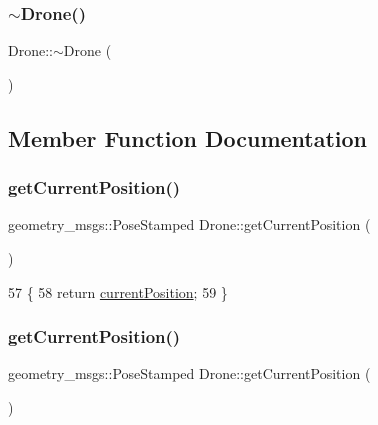 \mbox{\label{classDrone_a667075abb1eb5c54be6418884a387d14}} 
\subsubsection{\texorpdfstring{$\sim$\+Drone()}{~Drone()}\hspace{0.1cm}{\footnotesize\ttfamily [2/2]}}
{\footnotesize\ttfamily Drone\+::$\sim$\+Drone (\begin{DoxyParamCaption}{ }\end{DoxyParamCaption})}



\subsection{Member Function Documentation}
\mbox{\label{classDrone_a0113e8f3a3f438113dca0d77c065276b}} 
\subsubsection{\texorpdfstring{get\+Current\+Position()}{getCurrentPosition()}\hspace{0.1cm}{\footnotesize\ttfamily [1/2]}}
{\footnotesize\ttfamily geometry\+\_\+msgs\+::\+Pose\+Stamped Drone\+::get\+Current\+Position (\begin{DoxyParamCaption}{ }\end{DoxyParamCaption})}


\begin{DoxyCode}
57 \{
58         \textcolor{keywordflow}{return} \hyperlink{classDrone_a190e4f63bb9a0e5b4f822fc87f2185f9}{currentPosition};
59 \}
\end{DoxyCode}
\mbox{\label{classDrone_a0113e8f3a3f438113dca0d77c065276b}} 
\subsubsection{\texorpdfstring{get\+Current\+Position()}{getCurrentPosition()}\hspace{0.1cm}{\footnotesize\ttfamily [2/2]}}
{\footnotesize\ttfamily geometry\+\_\+msgs\+::\+Pose\+Stamped Drone\+::get\+Current\+Position (\begin{DoxyParamCaption}{ }\end{DoxyParamCaption})}

